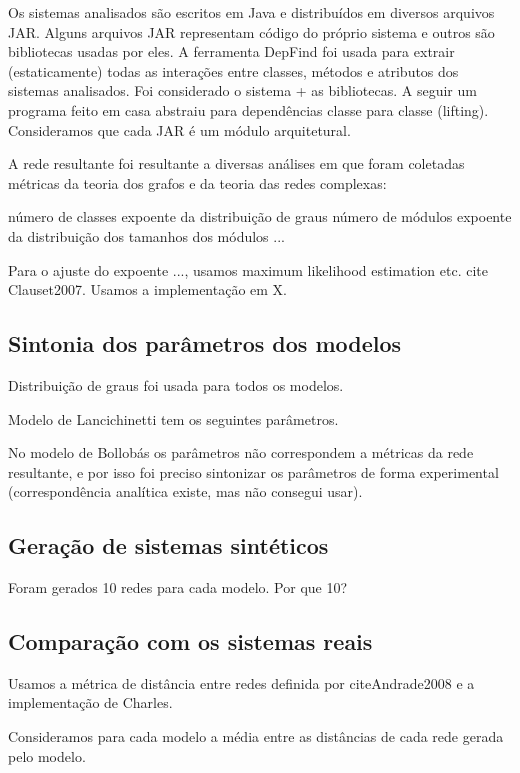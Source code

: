 \documentclass{acm_proc_article-sp}
\begin{document}
Os sistemas analisados são escritos em Java e distribuídos em diversos arquivos JAR. Alguns arquivos JAR representam código do próprio sistema e outros são bibliotecas usadas por eles. A ferramenta DepFind foi usada para extrair (estaticamente) todas as interações entre classes, métodos e atributos dos sistemas analisados. Foi considerado o sistema + as bibliotecas. A seguir um programa feito em casa abstraiu para dependências classe para classe (lifting). Consideramos que cada JAR é um módulo arquitetural.

A rede resultante foi resultante a diversas análises em que foram coletadas métricas da teoria dos grafos e da teoria das redes complexas:

número de classes
expoente da distribuição de graus
número de módulos
expoente da distribuição dos tamanhos dos módulos
...

Para o ajuste do expoente ..., usamos maximum likelihood estimation etc. cite Clauset2007. Usamos a implementação em X.

\subsection{Sintonia dos parâmetros dos modelos}

Distribuição de graus foi usada para todos os modelos.

Modelo de Lancichinetti tem os seguintes parâmetros.

No modelo de Bollobás os parâmetros não correspondem a métricas da rede resultante, e por isso foi preciso sintonizar os parâmetros de forma experimental (correspondência analítica existe, mas não consegui usar).

\subsection{Geração de sistemas sintéticos}

Foram gerados 10 redes para cada modelo. Por que 10?

\subsection{Comparação com os sistemas reais}

Usamos a métrica de distância entre redes definida por citeAndrade2008 e a implementação de Charles.

Consideramos para cada modelo a média entre as distâncias de cada rede gerada pelo modelo.
\end{document}
